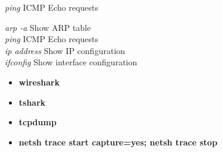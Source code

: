 \documentclass[a4paper,10pt]{article}
\begin{document}
\begin{multicols}{2}
\begin{tcolorbox}[breakable, title=Windows commands]
\textit{ping} ICMP Echo requests\\
\end{tcolorbox}
\begin{tcolorbox}[breakable, title=Linux commands]
\textit{arp -a} Show ARP table\\
\textit{ping} ICMP Echo requests\\
\textit{ip address} Show IP configuration\\
\textit{ifconfig} Show interface configuration\\
\end{tcolorbox}
\begin{tcolorbox}[breakable,title=Packet Capture]
\begin{itemize}
	\itemsep0em
	\item \textbf{wireshark}
	\item \textbf{tshark}
	\item \textbf{tcpdump}
	\item \textbf{netsh trace start capture=yes; netsh trace stop}
\end{itemize}
\end{tcolorbox}
\end{multicols}
\end{document}
